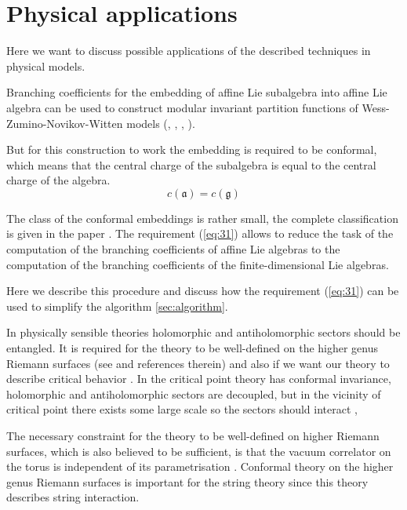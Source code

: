 \documentclass[a4paper,12pt]{article}
\theoremstyle{definition} \newtheorem{Def}{Definition}
\begin{document}
\newpage
\section{Physical applications}
\label{sec:phys-appl}
Here we want to discuss possible applications of the described techniques in physical models. 

Branching coefficients for the embedding of affine Lie subalgebra into
affine Lie algebra can be used to construct modular invariant
partition functions of Wess-Zumino-Novikov-Witten models (\cite{difrancesco1997cft}, \cite{Walton:1999xc}, \cite{walton1989conformal}, \cite{schellekens1986conformal}). 

But for this construction to work the embedding is required to be conformal, which means that the central charge of the subalgebra is equal to the central charge of the algebra.
\begin{equation}
  \label{eq:31}
  c(\mathfrak{a})=c(\mathfrak{g})
\end{equation}

 The class of the conformal embeddings is rather small, the complete classification is given in the paper \cite{schellekens1986conformal}. 
The requirement (\ref{eq:31}) allows to reduce the task of the computation of the branching coefficients of affine Lie algebras to the computation of the branching coefficients of the finite-dimensional Lie algebras.

Here we describe this procedure and discuss how the requirement (\ref{eq:31}) can be used to simplify the algorithm \ref{sec:algorithm}.


 In physically sensible theories holomorphic and antiholomorphic
 sectors should be entangled. It is required for the theory to be
 well-defined on the higher genus Riemann surfaces (see
 \cite{gaberdiel2000icf} and references therein) and also if we want
 our theory to describe critical behavior \cite{difrancesco1997cft}.
 In the critical point theory has conformal invariance, holomorphic
 and antiholomorphic sectors are decoupled, but in the vicinity of
 critical point there exists some large scale so the sectors should
 interact \cite{difrancesco1997cft}, 

The necessary constraint for the theory to be well-defined on higher Riemann surfaces, which is also believed to be sufficient, is that the vacuum correlator on the torus is independent of its parametrisation \cite{gaberdiel2000icf}. Conformal theory on the higher genus Riemann surfaces is important for the string theory since this theory describes string interaction.
\end{document}
